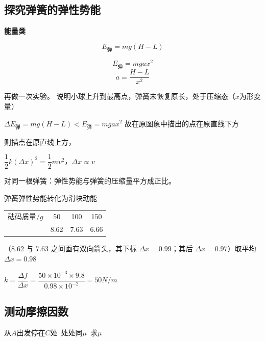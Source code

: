 \subsection{探究弹簧的弹性势能}
\textbf{能量类}


\[ E_{\text{弹}}=mg(H-L) \]


\[ E_{\text{弹}}=mgax^2 \]
\[ a=\frac{H-L}{x^2} \]

再做一次实验。 说明小球上升到最高点，弹簧未恢复原长，处于压缩态（$x$为形变量）

$\Delta E_{\text{弹}}=mg(H-L)<E_{\text{弹}}=mgax^2$ 故在原图象中描出的点在原直线下方 %

 则描点在原直线上方，

$\dfrac12k(\Delta x)^2=\dfrac12mv^2$，\quad $\Delta x\propto v$


\begin{keybox}
对同一根弹簧：弹性势能与弹簧的压缩量平方成正比。
\end{keybox}

弹簧弹性势能转化为滑块动能

\begin{center}
\begin{tabular}{@{}lccc@{}}
砝码质量$/\unit{g}$ & 50 & 100 & 150 \\
 & 8.62 & 7.63 & 6.66 \\
\end{tabular}
\end{center}
（8.62 与 7.63 之间画有双向箭头，其下标 $\Delta x=0.99$；其后 $\Delta x=0.97$）\quad 取平均 $\Delta x=0.98$

$k=\dfrac{\Delta f}{\Delta x}=\dfrac{50\times10^{-3}\times9.8}{0.98\times10^{-2}}=50\unit{N/m}$%

\subsection{测动摩擦因数}
从$A$出发停在$C$处\ 处处同$\mu$\ 求$\mu$


